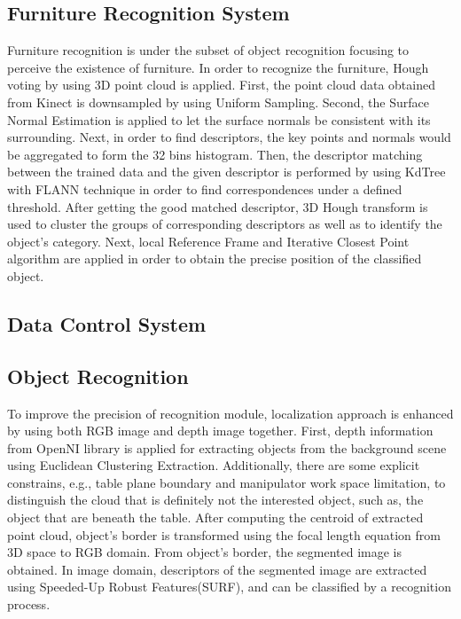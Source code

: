 \documentclass{llncs}
\begin{document}
\subsection{Furniture Recognition System}

Furniture recognition is under the subset of object recognition focusing to perceive the existence of furniture. In order to recognize the furniture, Hough voting by using 3D point cloud is applied. First, the point cloud data obtained from Kinect is downsampled by using Uniform Sampling. Second, the Surface Normal Estimation is applied to let the surface normals be consistent with its surrounding. Next, in order to find descriptors, the key points and normals would be aggregated to form the 32 bins histogram. Then, the descriptor matching between the trained data and the given descriptor is performed by using KdTree with FLANN technique in order to find correspondences under a defined threshold. After getting the good matched descriptor, 3D Hough transform is used to cluster the groups of corresponding descriptors as well as to identify the object's category. Next, local Reference Frame and Iterative Closest Point algorithm are applied in order to obtain the precise position of the classified object.\cite{furniture}

\subsection{Data Control System}


\subsection{Object Recognition}
    
To improve the precision of recognition module, localization approach is enhanced by using both RGB image and depth image together. First, depth information from OpenNI library is applied for extracting objects from the background scene using Euclidean Clustering Extraction\cite{rudu.thesis}. Additionally, there are some explicit constrains, e.g., table plane boundary and manipulator work space limitation, to distinguish the cloud that is definitely not the interested object, such as, the object that are beneath the table. After computing the centroid of extracted point cloud, object's border is transformed using the focal length equation from 3D space to RGB domain. From object's border, the segmented image is obtained. In image domain, descriptors of the segmented image are extracted using Speeded-Up Robust Features(SURF), and can be classified by a recognition process.
\end{document}
